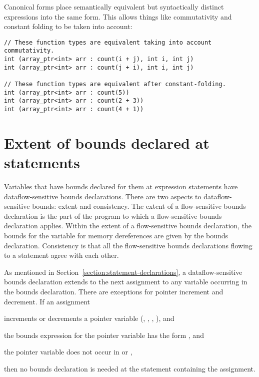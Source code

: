 Canonical forms place semantically equivalent but syntactically distinct
expressions into the same form.  This allows things like commutativity and constant
folding to be taken into account:
\begin{lstlisting}
// These function types are equivalent taking into account commutativity.
int (array_ptr<int> arr : count(i + j), int i, int j)
int (array_ptr<int> arr : count(j + i), int i, int j)

// These function types are equivalent after constant-folding.
int (array_ptr<int> arr : count(5))
int (array_ptr<int> arr : count(2 + 3))
int (array_ptr<int> arr : count(4 + 1))
\end{lstlisting}

\section{Extent of bounds declared at statements}
\label{section:extent-of-declarations}

Variables that have bounds declared for them at expression statements
have dataflow-sensitive bounds declarations. There are two aspects to
dataflow-sensitive bounds: extent and consistency. The extent of a
flow-sensitive bounds declaration is the part of the program to which
a flow-sensitive bounds
declaration applies. Within the extent of a flow-sensitive
bounds declaration, the
bounds for the variable for memory dereferences are given by the bounds
declaration. Consistency is that all the flow-sensitive bounds
declarations flowing to a statement agree with each other.

As mentioned in Section~\ref{section:statement-declarations},
a dataflow-sensitive bounds declaration
extends to the next assignment to any variable occurring in the bounds
declaration. There are exceptions for pointer increment and decrement.
If an assignment

\begin{compactitem}
\item
  increments or decrements a pointer variable (\code{++},
  \code{--}, \code{+=}, \code{-=}), and
\item
  the bounds expression for the pointer variable has the form
  , and
\item
  the pointer variable does not occur in  or ,
\end{compactitem}

then no bounds declaration is needed at the statement containing the
assignment.

